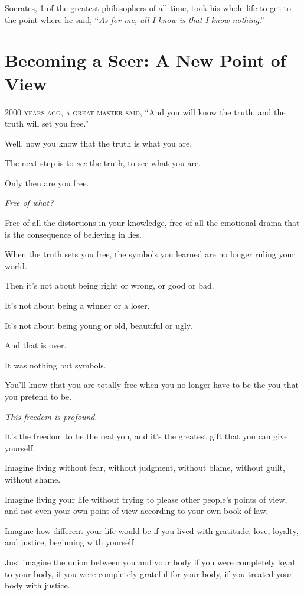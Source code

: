 \documentclass{article}
\numberwithin{equation}{section}
\begin{document}
Socrates, 1 of the greatest philosophers of all time, took his whole life to get to the point where he said, ``\textit{As for me, all I know is that I know nothing}.''

\section{Becoming a Seer: A New Point of View}
\textsc{2000 years ago, a great master said}, ``And you will know the truth, and the truth will set you free.''

Well, now you know that the truth is what you are.

The next step is to \textit{see} the truth, to see what you are.

Only then are you free.

\textit{Free of what?}

Free of all the distortions in your knowledge, free of all the emotional drama that is the consequence of believing in lies.

When the truth sets you free, the symbols you learned are no longer ruling your world.

Then it's not about being right or wrong, or good or bad.

It's not about being a winner or a loser.

It's not about being young or old, beautiful or ugly.

And that is over.

It was nothing but symbols.

%
You'll know that you are totally free when you no longer have to be the you that you pretend to be.

\textit{This freedom is profound}.

It's the freedom to be the real you, and it's the greatest gift that you can give yourself.

%
Imagine living without fear, without judgment, without blame, without guilt, without shame.

Imagine living your life without trying to please other people's points of view, and not even your own point of view according to your own book of law.

Imagine how different your life would be if you lived with gratitude, love, loyalty, and justice, beginning with yourself.

Just imagine the union between you and your body if you were completely loyal to your body, if you were completely grateful for your body, if you treated your body with justice.
\end{document}
